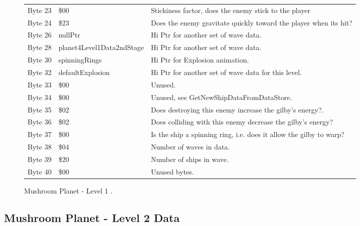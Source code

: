 \begin{figure}[H]
{\begin{adjustbox}{width=12cm}
\begin{tabular}{lll}
 Byte 23 & \$00                       & Stickiness factor, does the enemy stick to the player              \\
 Byte 24 & \$23                       & Does the enemy gravitate quickly toward the player when its hit?   \\
 Byte 26 & nullPtr                   & Hi Ptr for another set of wave data.                               \\
 Byte 28 & planet4Level1Data2ndStage & Hi Ptr for another set of wave data.                               \\
 Byte 30 & spinningRings             & Hi Ptr for Explosion animation.                                    \\
 Byte 32 & defaultExplosion          & Hi Ptr for another set of wave data for this level.                \\
 Byte 33 & \$00                       & Unused.                                                            \\
 Byte 34 & \$00                       & Unused, see GetNewShipDataFromDataStore.                           \\
 Byte 35 & \$02                       & Does destroying this enemy increase the gilby's energy?.           \\
 Byte 36 & \$02                       & Does colliding with this enemy decrease the gilby's energy?        \\
 Byte 37 & \$00                       & Is the ship a spinning ring, i.e. does it allow the gilby to warp? \\
 Byte 38 & \$04                       & Number of waves in data.                                           \\
 Byte 39 & \$20                       & Number of ships in wave.                                           \\
 Byte 40 & \$00                       & Unused bytes.                                                      \\
\bottomrule
\end{tabular}

  \end{adjustbox}

  }\caption*{Mushroom Planet - Level 1
.}
\end{figure}

\clearpage
\subsection{Mushroom Planet - Level 2 Data}

